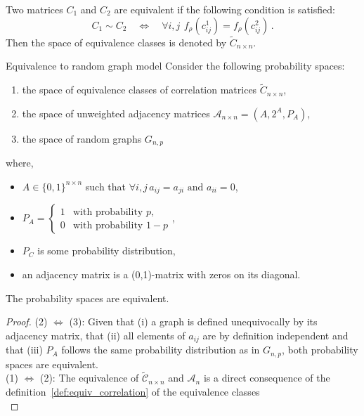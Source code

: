 \begin{definition}
\label{def:equiv_correlation}
Two matrices $C_1$ and $C_2$ are equivalent if the following condition is satisfied:
\begin{equation}C_1\sim C_2\quad \Leftrightarrow \quad \forall i,j \,\ f_{\rho}(c^1_{ij}) = f_{\rho}(c^2_{ij})\,.\end{equation}
Then the space of equivalence classes is denoted by $\widetilde{C}_{n\times n}$. 
\end{definition}



\begin{theorem}{Equivalence to random graph model}
\label{thm:equivalence_random_graph_model}
Consider the following probability spaces:
\begin{enumerate}
	\item the space of equivalence classes of correlation matrices $\widetilde{C}_{n\times n}$,
	\item the space of unweighted adjacency matrices $\mathcal{A}_{n\times n} = \left( A, 2^A, P_A \right)$,
	\item the space of random graphs $G_{n,p}$
\end{enumerate}
\noindent where,
\begin{itemize}
	\item[] $A \in \{0,1\}^{n \times n}$ such that $\forall i,j\,  a_{ij} = a_{ji} \text{ and } a_{ii} = 0$,
	\item[] $P_A = \begin{cases} 1 & \text{with probability } p,\\0 & \text{with probability } 1-p\end{cases}$,
	\item[] $P_C$ is some probability distribution,
	\item[] an adjacency matrix is a (0,1)-matrix with zeros on its diagonal.
\end{itemize}
The probability spaces are equivalent.
\end{theorem}

\begin{proof}

(2) $\Leftrightarrow$ (3):
Given that (i) a graph is defined unequivocally by its adjacency matrix, that (ii) all elements of $a_{ij}$ are by definition independent and that (iii) $P_A$ follows the same probability distribution as in $G_{n,p}$, both probability spaces are equivalent.
\\
(1) $\Leftrightarrow$ (2):
The equivalence of $\widetilde{\mathcal{C}}_{n\times n}$ and $\mathcal{A}_n$ is a direct consequence of the definition~\ref{def:equiv_correlation} of the equivalence classes \\
\end{proof}


